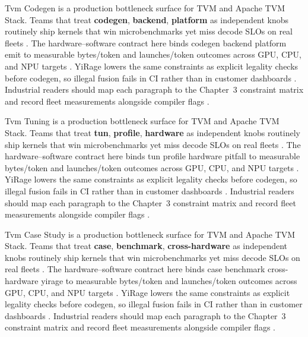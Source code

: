 Tvm Codegen is a production bottleneck surface for TVM and Apache TVM Stack. Teams that treat \textbf{codegen}, \textbf{backend}, \textbf{platform} as independent knobs routinely ship kernels that win microbenchmarks yet miss decode SLOs on real fleets \citep{semianalysis2024tma,dlbook}. The hardware--software contract here binds codegen backend platform emit to measurable bytes/token and launches/token outcomes across GPU, CPU, and NPU targets \citep{amd2024xdna,dao2022flashattention}. YiRage lowers the same constraints as explicit legality checks before codegen, so illegal fusion fails in CI rather than in customer dashboards \citep{amd2024aie,kwon2023vllm}. Industrial readers should map each paragraph to the Chapter~3 constraint matrix and record fleet measurements alongside compiler flags \citep{dlbook,nvidia2024cudagraphs}.

Tvm Tuning is a production bottleneck surface for TVM and Apache TVM Stack. Teams that treat \textbf{tun}, \textbf{profile}, \textbf{hardware} as independent knobs routinely ship kernels that win microbenchmarks yet miss decode SLOs on real fleets \citep{amd2024xdna,dao2022flashattention}. The hardware--software contract here binds tun profile hardware pitfall to measurable bytes/token and launches/token outcomes across GPU, CPU, and NPU targets \citep{amd2024aie,kwon2023vllm}. YiRage lowers the same constraints as explicit legality checks before codegen, so illegal fusion fails in CI rather than in customer dashboards \citep{dlbook,nvidia2024cudagraphs}. Industrial readers should map each paragraph to the Chapter~3 constraint matrix and record fleet measurements alongside compiler flags \citep{dao2022flashattention,liu2024deepseekv3}.

Tvm Case Study is a production bottleneck surface for TVM and Apache TVM Stack. Teams that treat \textbf{case}, \textbf{benchmark}, \textbf{cross-hardware} as independent knobs routinely ship kernels that win microbenchmarks yet miss decode SLOs on real fleets \citep{amd2024aie,kwon2023vllm}. The hardware--software contract here binds case benchmark cross-hardware yirage to measurable bytes/token and launches/token outcomes across GPU, CPU, and NPU targets \citep{dlbook,nvidia2024cudagraphs}. YiRage lowers the same constraints as explicit legality checks before codegen, so illegal fusion fails in CI rather than in customer dashboards \citep{dao2022flashattention,liu2024deepseekv3}. Industrial readers should map each paragraph to the Chapter~3 constraint matrix and record fleet measurements alongside compiler flags \citep{kwon2023vllm,patel2025llminference}.

